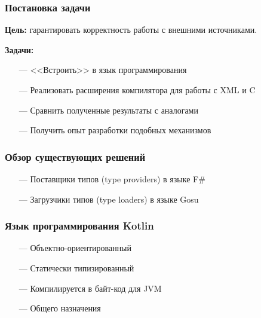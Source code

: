 \documentclass[14pt]{beamer}
\begin{document}
\begin{frame}\frametitle{Постановка задачи}

    \textbf{Цель:} гарантировать корректность работы с внешними источниками.

    \textbf{Задачи:}
    \begin{itemize}
        \item[---] {<<Встроить>>} в язык программирования
        \item[---] Реализовать расширения компилятора для работы с XML и C
        \item[---] Сравнить полученные результаты с аналогами
        \item[---] Получить опыт разработки подобных механизмов
    \end{itemize}


\end{frame}

\begin{frame}\frametitle{Обзор существующих решений} %
    \begin{itemize}
        \item[---] Поставщики типов (type providers) в языке F\#
        \item[---] Загрузчики типов (type loaders) в языке Gosu
    \end{itemize}
\end{frame}

\begin{frame}\frametitle{Язык программирования Kotlin}
    \begin{itemize}
        \item[---] Объектно-ориентированный
        \item[---] Статически типизированный
        \item[---] Компилируется в байт-код для JVM
        \item[---] Общего назначения
    \end{itemize}
\end{frame}
\end{document}
